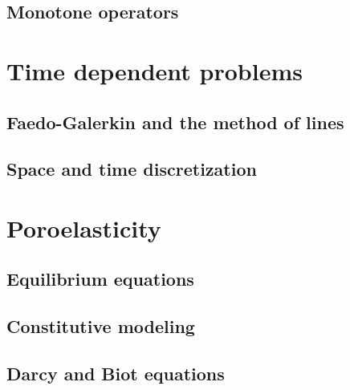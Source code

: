 \documentclass{article}
\begin{document}
\subsection{Monotone operators}

\section{Time dependent problems}

\subsection{Faedo-Galerkin and the method of lines}

\subsection{Space and time discretization}

\section{Poroelasticity}

\subsection{Equilibrium equations}

\subsection{Constitutive modeling}

\subsection{Darcy and Biot equations}



\end{document}
